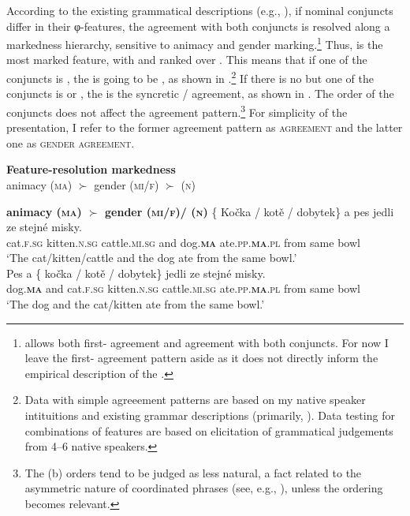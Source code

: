 \documentclass[output=paper,modfontsnewtxmath,hidelinks]{langscibook}
\begin{document}
According to the existing grammatical descriptions (e.g., \citealt{Panevova1997}), if nominal conjuncts differ in their φ-features, the agreement with both conjuncts is resolved along a markedness hierarchy, sensitive to animacy and gender marking.\footnote{ allows both first- agreement and agreement with both conjuncts. For now I leave the first- agreement pattern aside as it does not directly inform the empirical description of the .} Thus,   is the most marked feature, with   and  ranked over . This means that if one of the conjuncts is  , the  is going to be  , as shown in .\footnote{Data with simple agreeement patterns are based on my native speaker intituitions and existing grammar descriptions (primarily, \citealt{Panevova1997,corbett83}). Data testing for combinations of features are based on elicitation of grammatical judgements from 4--6 native speakers.} If there is no    but one of the conjuncts is   or , the  is the syncretic  / agreement, as shown in . The order of the conjuncts does not affect the agreement pattern.\footnote{The (b) orders tend to be judged as less natural, a fact related to the asymmetric nature of coordinated  phrases (see, e.g., \citealt{Johannessen1996}), unless the ordering becomes relevant.} For simplicity of the presentation, I refer to the former agreement pattern as \textsc{ agreement} and the latter one as \textsc{gender agreement}. 

\ea \textbf{Feature-resolution markedness}\\
animacy (\textsc{ma}) $\succ$ gender ({\textsc{mi}/\textsc{f}}) $\succ$  (\textsc{n})
\z

\ea\label{baseline-anim} \textbf{animacy (\textsc{ma}) $\succ$ gender ({\textsc{mi}/\textsc{f}})/ (\textsc{n})}
\ea\gll \{\hspace{-2pt} Kočka / kotě / dobytek\} a pes jedli ze stejné misky.\\
{} cat.\textsc{f.sg} {} kitten.\textsc{n.sg} {} cattle.\textsc{mi.sg} and dog.\textsc{\textbf{ma}} ate.\textsc{pp.\textbf{ma}.pl} from same bowl\\
\glt `The cat/kitten/cattle and the dog ate from the same bowl.'\\\hfill {}\smallskip
\ex\gll Pes a \{\hspace{-2pt} kočka / kotě / dobytek\} jedli ze stejné misky.\\
dog.\textsc{\textbf{ma}} and {} cat.\textsc{f.sg} {} kitten.\textsc{n.sg} {} cattle.\textsc{mi.sg} ate.\textsc{pp.\textbf{ma}.pl} from same bowl\\
\glt `The dog and the cat/kitten ate from the same bowl.'\\\hfill {}
\z\z
\end{document}
